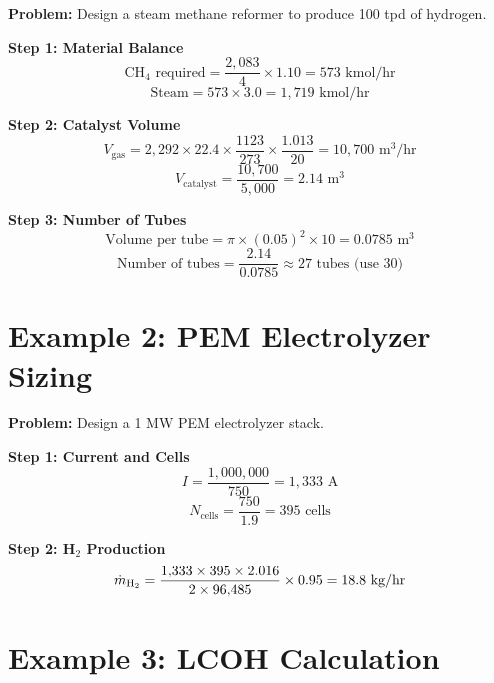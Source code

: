 \documentclass[12pt,twoside,openany]{book}
\begin{document}
\textbf{Problem:} Design a steam methane reformer to produce 100 tpd of hydrogen.

\textbf{Step 1: Material Balance}
\begin{dmath}
\text{CH}_4 \text{ required} = \frac{2{,}083}{4} \times 1.10 = 573\text{ kmol/hr}
\end{dmath}
\begin{dmath}
\text{Steam} = 573 \times 3.0 = 1{,}719\text{ kmol/hr}
\end{dmath}

\textbf{Step 2: Catalyst Volume}
\begin{dmath}
V_{\text{gas}} = 2{,}292 \times 22.4
                 \times \frac{1123}{273} \times \frac{1.013}{20}
               = 10{,}700\text{ m}^3/\text{hr}
\end{dmath}
\begin{dmath}
V_{\text{catalyst}} = \frac{10{,}700}{5{,}000} = 2.14\text{ m}^3
\end{dmath}

\textbf{Step 3: Number of Tubes}
\begin{dmath}
\text{Volume per tube} = \pi \times (0.05)^2 \times 10 = 0.0785\text{ m}^3
\end{dmath}
\begin{dmath}
\text{Number of tubes} = \frac{2.14}{0.0785} \approx 27 \text{ tubes (use 30)}
\end{dmath}

\section{Example 2: PEM Electrolyzer Sizing}

\textbf{Problem:} Design a 1 MW PEM electrolyzer stack.

\textbf{Step 1: Current and Cells}
\begin{dmath}
I = \frac{1{,}000{,}000}{750} = 1{,}333\text{ A}
\end{dmath}
\begin{dmath}
N_{\text{cells}} = \frac{750}{1.9} = 395\text{ cells}
\end{dmath}

\textbf{Step 2: H$_2$ Production}
\begin{dmath}
\dot{m}_{\ce{H2}}
    = \frac{1{,}333 \times 395 \times 2.016}{2 \times 96{,}485} \times 0.95
    = 18.8\text{ kg/hr}
\end{dmath}

\section{Example 3: LCOH Calculation}
\end{document}
